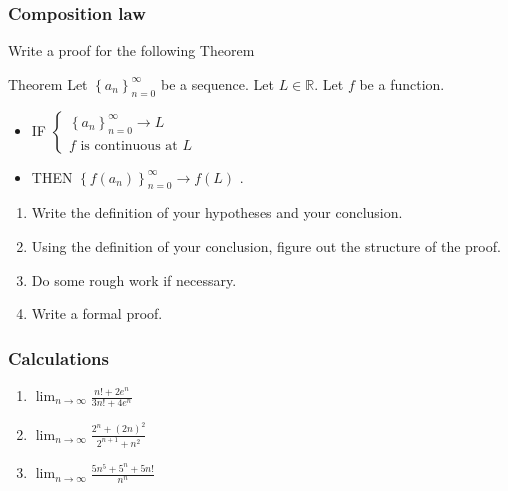 \documentclass[14pt]{beamer}
\begin{document}
\begin{frame}[t]
	\fontsize{13}{13}\selectfont
	\frametitle{Composition law}
	Write a proof for the following Theorem
	\begin{block}{Theorem}
		Let $\displaystyle \left\{ a_{n} \right\}_{n=0}^{\infty}$ be a sequence. Let
		$\displaystyle L \in \mathbb{R}$. Let $f$ be a function.
		\begin{itemize}
			\item IF $\displaystyle
				\begin{cases}
					\left\{ a_{n} \right\}_{n=0}^{\infty}\longrightarrow L \\
					f \text{ is continuous at }L
				\end{cases}$

			\item THEN $\displaystyle \left\{ f(a_{n}) \right\}_{n=0}^{\infty}\longrightarrow
				f(L)$ .
		\end{itemize}
	\end{block}
	\begin{enumerate}
		\item Write the definition of your hypotheses and your conclusion.

		\item Using the definition of your conclusion, figure out the structure of
			the proof.

		\item Do some rough work if necessary.

		\item Write a formal proof.
	\end{enumerate}
\end{frame}

\begin{frame}[t]
	\frametitle{Calculations}

	\begin{enumerate}
		\item $\displaystyle \lim_{n \to \infty}\frac{n! + 2 e^{n}}{3n! + 4 e^{n}}$

			\vfill

		\item $\displaystyle \lim_{n \to \infty}\frac{2^{n}+ (2n)^{2}}{2^{n+1}+ n^{2}}$

			\vfill

		\item $\displaystyle \lim_{n \to \infty}\frac{5n^{5}+ 5^{n}+ 5n! }{n^{n}}$
	\end{enumerate}

	\vfill
\end{frame}
\end{document}
